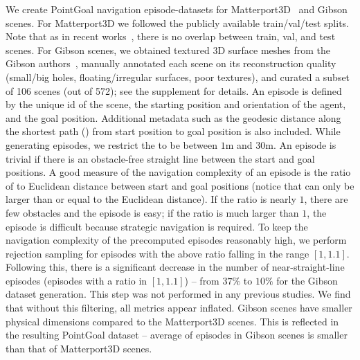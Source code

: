 We create PointGoal navigation episode-datasets for Matterport3D~\cite{Chang2017} and Gibson~\cite{Xia2018} scenes. 
For Matterport3D we followed the publicly available train/val/test splits.
Note that as in recent works~\cite{embodiedqa, mishkin2019benchmarking, kojima2019learn}, 
there is no overlap between train, val, and test scenes. 
For Gibson scenes, we obtained textured 3D surface meshes from the Gibson authors~\cite{Xia2018}, manually annotated each scene 
on its reconstruction quality 
(small/big holes, floating/irregular surfaces, poor textures), 
and curated a subset of 106 scenes (out of 572); 
see the supplement for details.
An episode is defined by the unique id of the scene, the starting position and orientation of the agent, and the goal position.
Additional metadata such as the geodesic distance along the shortest path (\gdsp) from start position to goal position is also included.
While generating episodes, we restrict the \gdsp 
to be between $1\text{m}$ and $30\text{m}$.
%
%
%
An episode is trivial if there is an obstacle-free straight line between the start and goal positions.
A good measure of the navigation complexity of an episode is the ratio of \gdsp to Euclidean distance between start and goal positions (notice that \gdsp can only be larger than or equal to the Euclidean distance).
If the ratio is nearly $1$, there are few obstacles and the episode is easy; if the ratio is much larger than $1$, the 
episode is difficult because strategic navigation is required. 
To keep the navigation complexity of the precomputed episodes reasonably high, we perform rejection sampling for episodes with the above ratio falling in the range $[1, 1.1]$. 
Following this, there is a significant decrease in the number of  near-straight-line episodes (episodes with a ratio in $[1, 1.1]$)
 -- from $37\%$ to $10\%$ for the Gibson dataset generation. 
This step was not performed in any previous studies.
We find that without this filtering, all metrics appear inflated.
Gibson scenes have smaller physical dimensions compared to 
the Matterport3D scenes.
This is reflected in the resulting PointGoal dataset -- 
average \gdsp of episodes in Gibson scenes is smaller than that of Matterport3D scenes.

